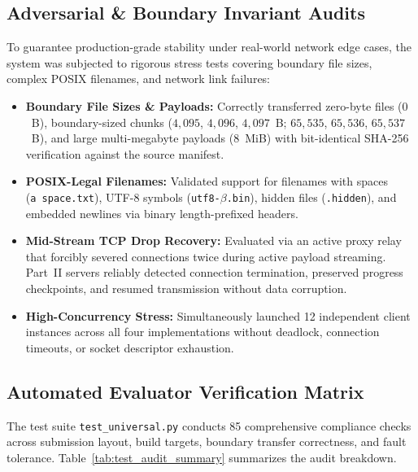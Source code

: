 \documentclass[11pt,a4paper]{article}
\begin{document}
\subsection{Adversarial \& Boundary Invariant Audits}
To guarantee production-grade stability under real-world network edge cases, the system was subjected to rigorous stress tests covering boundary file sizes, complex POSIX filenames, and network link failures:
\begin{itemize}
    \item \textbf{Boundary File Sizes \& Payloads:} Correctly transferred zero-byte files ($0$~B), boundary-sized chunks ($4{,}095$, $4{,}096$, $4{,}097$~B; $65{,}535$, $65{,}536$, $65{,}537$~B), and large multi-megabyte payloads ($8$~MiB) with bit-identical SHA-256 verification against the source manifest.
    \item \textbf{POSIX-Legal Filenames:} Validated support for filenames with spaces (\texttt{a~space.txt}), UTF-8 symbols (\texttt{utf8-$\beta$.bin}), hidden files (\texttt{.hidden}), and embedded newlines via binary length-prefixed headers.
    \item \textbf{Mid-Stream TCP Drop Recovery:} Evaluated via an active proxy relay that forcibly severed connections twice during active payload streaming. Part~II servers reliably detected connection termination, preserved progress checkpoints, and resumed transmission without data corruption.
    \item \textbf{High-Concurrency Stress:} Simultaneously launched 12 independent client instances across all four implementations without deadlock, connection timeouts, or socket descriptor exhaustion.
\end{itemize}

\subsection{Automated Evaluator Verification Matrix}
The test suite \texttt{test\_universal.py} conducts 85 comprehensive compliance checks across submission layout, build targets, boundary transfer correctness, and fault tolerance. Table~\ref{tab:test_audit_summary} summarizes the audit breakdown.
\end{document}
